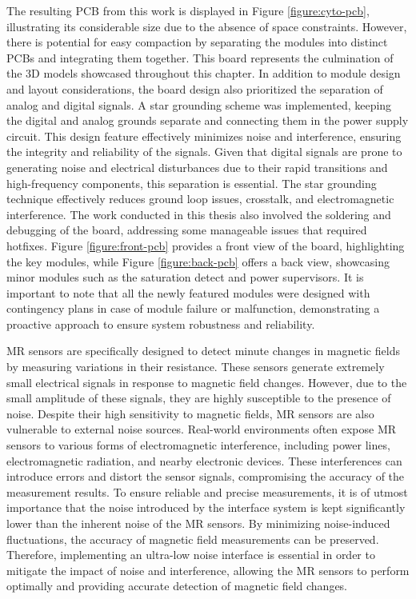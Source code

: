 The resulting \ac{PCB} from this work is displayed in Figure \ref{figure:cyto-pcb}, illustrating its considerable size due to the absence of space constraints. However, there is potential for easy compaction by separating the modules into distinct \ac{PCB}s and integrating them together. This board represents the culmination of the \ac{3D} models showcased throughout this chapter. In addition to module design and layout considerations, the board design also prioritized the separation of analog and digital signals. A star grounding scheme was implemented, keeping the digital and analog grounds separate and connecting them in the power supply circuit. This design feature effectively minimizes noise and interference, ensuring the integrity and reliability of the signals. Given that digital signals are prone to generating noise and electrical disturbances due to their rapid transitions and high-frequency components, this separation is essential. The star grounding technique effectively reduces ground loop issues, crosstalk, and electromagnetic interference. The work conducted in this thesis also involved the soldering and debugging of the board, addressing some manageable issues that required hotfixes. Figure \ref{figure:front-pcb} provides a front view of the board, highlighting the key modules, while Figure \ref{figure:back-pcb} offers a back view, showcasing minor modules such as the saturation detect and power supervisors. It is important to note that all the newly featured modules were designed with contingency plans in case of module failure or malfunction, demonstrating a proactive approach to ensure system robustness and reliability.


\noindent
\ac{MR} sensors are specifically designed to detect minute changes in magnetic fields by measuring variations in their resistance. These sensors generate extremely small electrical signals in response to magnetic field changes. However, due to the small amplitude of these signals, they are highly susceptible to the presence of noise. Despite their high sensitivity to magnetic fields, \ac{MR} sensors are also vulnerable to external noise sources. Real-world environments often expose \ac{MR} sensors to various forms of electromagnetic interference, including power lines, electromagnetic radiation, and nearby electronic devices. These interferences can introduce errors and distort the sensor signals, compromising the accuracy of the measurement results. To ensure reliable and precise measurements, it is of utmost importance that the noise introduced by the interface system is kept significantly lower than the inherent noise of the \ac{MR} sensors. By minimizing noise-induced fluctuations, the accuracy of magnetic field measurements can be preserved. Therefore, implementing an ultra-low noise interface is essential in order to mitigate the impact of noise and interference, allowing the \ac{MR} sensors to perform optimally and providing accurate detection of magnetic field changes.


